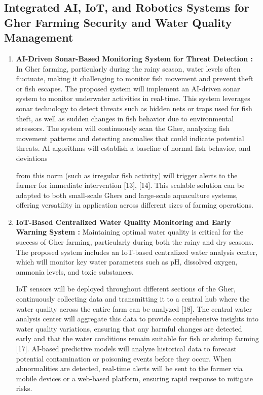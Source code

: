 \documentclass[conference]{IEEEtran}
\begin{document}
\subsection{\textbf{Integrated AI, IoT, and Robotics Systems for Gher Farming Security and Water Quality Management}}
\begin{enumerate}
	\item \textbf{AI-Driven Sonar-Based Monitoring System for Threat Detection : }
In Gher farming, particularly during the rainy season, water levels often fluctuate, making it challenging to monitor fish movement and prevent theft or fish escapes. The proposed system will implement an AI-driven sonar system to monitor underwater activities in real-time. This system leverages sonar technology to detect threats such as hidden nets or traps used for fish theft, as well as sudden changes in fish behavior due to environmental stressors.
The system will continuously scan the Gher, analyzing fish movement patterns and detecting anomalies that could indicate potential threats. AI algorithms will establish a baseline of normal fish behavior, and deviations 

from this norm (such as irregular fish activity) will trigger alerts to the farmer for immediate intervention [13], [14]. This scalable solution can be adapted to both small-scale Ghers and large-scale aquaculture systems, offering versatility in application across different sizes of farming operations.
	
	\item \textbf{IoT-Based Centralized Water Quality Monitoring and Early Warning System : }
	Maintaining optimal water quality is critical for the success of Gher farming, particularly during both the rainy and dry seasons. The proposed system includes an IoT-based centralized water analysis center, which will monitor key water parameters such as pH, dissolved oxygen, ammonia levels, and toxic substances.
	
IoT sensors will be deployed throughout different sections of the Gher, continuously collecting data and transmitting it to a central hub where the water quality across the entire farm can be analyzed [18]. The central water analysis center will aggregate this data to provide comprehensive insights into water quality variations, ensuring that any harmful changes are detected early and that the water conditions remain suitable for fish or shrimp farming [17]. AI-based predictive models will analyze historical data to forecast potential contamination or poisoning events before they occur. When abnormalities are detected, real-time alerts will be sent to the farmer via mobile devices or a web-based platform, ensuring rapid response to mitigate risks.



\end{enumerate}
\end{document}
